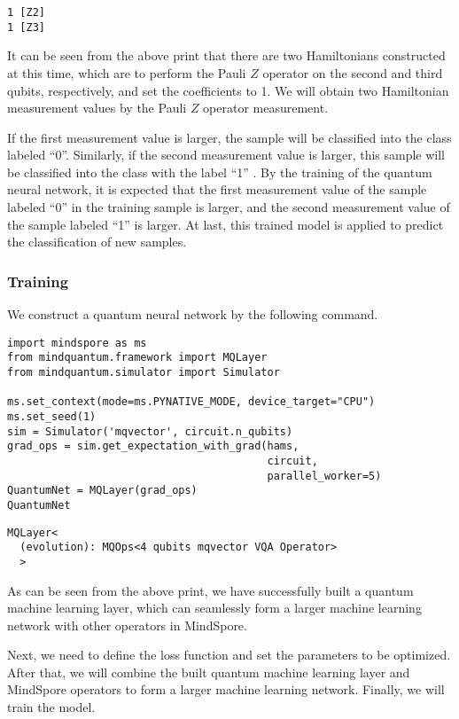 \begin{lstlisting}
1 [Z2]
1 [Z3]
\end{lstlisting}

It can be seen from the above print that there are two Hamiltonians constructed at this time, which are to perform the Pauli $Z$ operator on the second and third qubits, respectively, and set the coefficients to 1. We will obtain two Hamiltonian measurement values by the Pauli $Z$ operator measurement.

If the first measurement value is larger, the sample will be classified into the class labeled ``0''.  Similarly, if the second measurement value is larger, this sample will be classified into the class with the label ``1'' . By the training of the quantum neural network, it is expected that the first measurement value of the sample labeled ``0''  in the training sample is larger, and the second measurement value of the sample labeled ``1'' is larger. At last, this trained model is applied to predict the classification of new samples.

\subsubsection{Training}
We construct a quantum neural network by the following command.

\begin{lstlisting}
import mindspore as ms
from mindquantum.framework import MQLayer
from mindquantum.simulator import Simulator

ms.set_context(mode=ms.PYNATIVE_MODE, device_target="CPU")
ms.set_seed(1)
sim = Simulator('mqvector', circuit.n_qubits)
grad_ops = sim.get_expectation_with_grad(hams,
                                         circuit,
                                         parallel_worker=5)
QuantumNet = MQLayer(grad_ops)
QuantumNet
\end{lstlisting}

\begin{lstlisting}
MQLayer<
  (evolution): MQOps<4 qubits mqvector VQA Operator>
  >
\end{lstlisting}

As can be seen from the above print, we have successfully built a quantum machine learning layer, which can seamlessly form a larger machine learning network with other operators in MindSpore.

Next, we need to define the loss function and set the parameters to be optimized. After that, we will combine the built quantum machine learning layer and MindSpore operators to form a larger machine learning network. Finally, we will train the model. %

